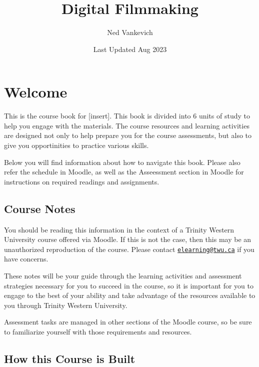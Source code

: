 \documentclass[
]{book}
\title{Digital Filmmaking}
\author{Ned Vankevich}
\date{Last Updated Aug 2023}
\begin{document}
\maketitle

{
\setcounter{tocdepth}{1}
\tableofcontents
}
\hypertarget{welcome}{%
\chapter*{Welcome}\label{welcome}}

This is the course book for {[}insert{]}. This book is divided into 6 units of study to help you engage with the materials. The course resources and learning activities are designed not only to help prepare you for the course assessments, but also to give you opportinities to practice various skills.

Below you will find information about how to navigate this book. Please also refer the schedule in Moodle, as well as the Asseessment section in Moodle for instructions on required readings and assignments.

\hypertarget{course-notes}{%
\section*{Course Notes}\label{course-notes}}

You should be reading this information in the context of a Trinity Western University course offered via Moodle. If this is not the case, then this may be an unauthorized reproduction of the course. Please contact \href{mailto:elearning@twu.ca}{\nolinkurl{elearning@twu.ca}} if you have concerns.

These notes will be your guide through the learning activities and assessment strategies necessary for you to succeed in the course, so it is important for you to engage to the best of your ability and take advantage of the resources available to you through Trinity Western University.

Assessment tasks are managed in other sections of the Moodle course, so be sure to familiarize yourself with those requirements and resources.

\hypertarget{how-this-course-is-built}{%
\section*{How this Course is Built}\label{how-this-course-is-built}}
\end{document}
